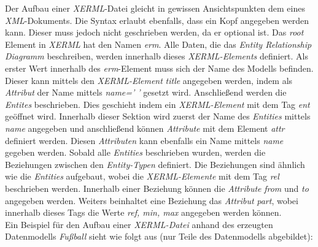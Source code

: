 \noindent
Der Aufbau einer \textit{XERML}-Datei gleicht in gewissen Ansichtspunkten  dem eines \textit{XML}-Dokuments. Die Syntax erlaubt ebenfalls, dass ein Kopf angegeben werden kann. Dieser muss jedoch nicht geschrieben werden, da er optional ist. Das \textit{root} Element in \textit{XERML} hat den Namen \textit{erm}. Alle Daten, die das \textit{Entity Relationship Diagramm} beschreiben, werden innerhalb dieses \textit{XERML-Elements} definiert. Als erster Wert innerhalb des \textit{erm}-Element muss sich der Name des Modells befinden. Dieser kann mittels den \textit{XERML-Element} \textit{title} angegeben werden, indem als \textit{Attribut} der Name mittels \textit{name=' '} gesetzt wird. Anschließend werden die \textit{Entites} beschrieben. Dies geschieht indem ein \textit{XERML-Element} mit dem Tag \textit{ent} geöffnet wird. Innerhalb dieser Sektion wird zuerst der Name des \textit{Entities} mittels \textit{name} angegeben und anschließend können \textit{Attribute} mit dem Element \textit{attr} definiert werden. Diesen \textit{Attributen} kann ebenfalls ein Name mittels \textit{name} gegeben werden. Sobald alle \textit{Entities} beschrieben wurden, werden die Beziehungen zwischen den \textit{Entity-Typen} definiert. Die Beziehungen sind ähnlich wie die \textit{Entities} aufgebaut, wobei die \textit{XERML-Elemente} mit dem Tag \textit{rel} beschrieben werden. Innerhalb einer Beziehung können die \textit{Attribute} \textit{from} und \textit{to} angegeben werden. Weiters beinhaltet eine Beziehung das \textit{Attribut} \textit{part}, wobei innerhalb dieses Tags die Werte \textit{ref, min, max} angegeben werden können.
\\

\pra
\noindent
Ein Beispiel für den Aufbau einer \textit{XERML-Datei} anhand des erzeugten Datenmodells \textit{Fußball} sieht wie folgt aus (nur Teile des Datenmodells abgebildet):

